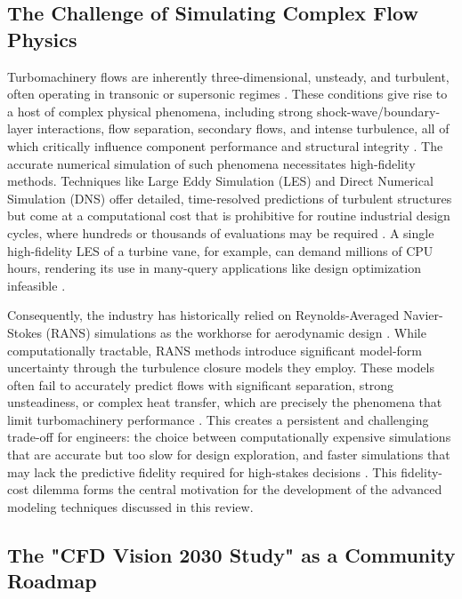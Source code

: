\documentclass[dsc, EN]{ufabcFHZh}
\begin{document}
\subsection{The Challenge of Simulating Complex Flow Physics}

Turbomachinery flows are inherently three-dimensional, unsteady, and turbulent, often operating in transonic or supersonic regimes \citep{synthesized2024}. These conditions give rise to a host of complex physical phenomena, including strong shock-wave/boundary-layer interactions, flow separation, secondary flows, and intense turbulence, all of which critically influence component performance and structural integrity \citep{synthesized2024, turbo_146_3_031009}. The accurate numerical simulation of such phenomena necessitates high-fidelity methods. Techniques like Large Eddy Simulation (LES) and Direct Numerical Simulation (DNS) offer detailed, time-resolved predictions of turbulent structures but come at a computational cost that is prohibitive for routine industrial design cycles, where hundreds or thousands of evaluations may be required \citep{synthesized2024, peherstorfer2018survey}. A single high-fidelity LES of a turbine vane, for example, can demand millions of CPU hours, rendering its use in many-query applications like design optimization infeasible \citep{peherstorfer2018survey}.

Consequently, the industry has historically relied on Reynolds-Averaged Navier-Stokes (RANS) simulations as the workhorse for aerodynamic design \citep{synthesized2024}. While computationally tractable, RANS methods introduce significant model-form uncertainty through the turbulence closure models they employ. These models often fail to accurately predict flows with significant separation, strong unsteadiness, or complex heat transfer, which are precisely the phenomena that limit turbomachinery performance \citep{synthesized2024, ijtpp-07-00016-v2}. This creates a persistent and challenging trade-off for engineers: the choice between computationally expensive simulations that are accurate but too slow for design exploration, and faster simulations that may lack the predictive fidelity required for high-stakes decisions \citep{synthesized2024}. This fidelity-cost dilemma forms the central motivation for the development of the advanced modeling techniques discussed in this review.

\subsection{The "CFD Vision 2030 Study" as a Community Roadmap}
\end{document}
